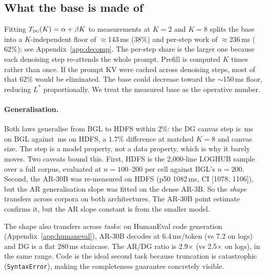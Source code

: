 \subsection{What the base is made of}

Fitting $T_{\textsc{dg}}(K) = \alpha + \beta K$ to measurements at
$K{=}2$ and $K{=}8$ splits the base into a $K$-independent floor of
$\approx$143\,ms ($38\%$) and per-step work of $\approx$236\,ms
($62\%$); see Appendix~\ref{app:decomp}. The per-step share is the
larger one because each denoising step re-attends the whole prompt.
Prefill is computed $K$ times rather than once. If the prompt KV were
cached across denoising steps, most of that $62\%$ would be eliminated.
The base could decrease toward the $\sim$150\,ms floor, reducing
$L^{*}$ proportionally. We treat the measured base as the operative
number.

\paragraph{Generalisation.}

Both laws generalise from BGL to HDFS within 2\%: the DG canvas step
is \bglStep\,ms on BGL against \hdfsStep\,ms on HDFS, a $1.7\%$
difference at matched $K{=}8$ and canvas size. The step is a model
property, not a data property, which is why it barely moves. Two
caveats bound this. First, HDFS is the 2{,}000-line LOGHUB
sample~\cite{loghub} over a full corpus, evaluated at
$n{=}100$--$200$ per cell against BGL's $n{=}200$. Second, the AR-30B
was re-measured on HDFS (p50 1082\,ms, CI [1078, 1106]), but the AR
generalisation slope was fitted on the dense AR-3B. So the
\emph{shape} transfers across corpora on both architectures. The
AR-30B point estimate confirms it, but the AR slope constant is from
the smaller model.

The shape also transfers across \emph{tasks}: on HumanEval code
generation (Appendix~\ref{app:humaneval}), AR-30B decodes at
6.4\,ms/token (vs 7.2 on logs) and DG is a flat 280\,ms staircase. The
AR/DG ratio is 2.9$\times$ (vs 2.5$\times$ on logs), in the same range.
Code is the ideal second task because truncation is catastrophic
(\texttt{SyntaxError}), making the completeness guarantee concretely
visible.
